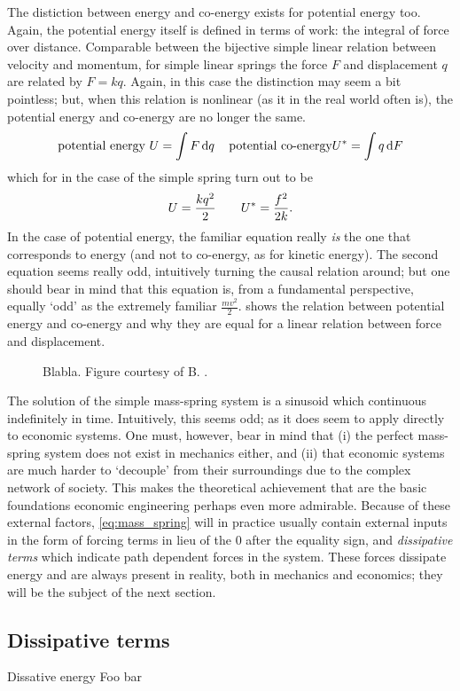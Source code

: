 The distiction between energy and co-energy exists for potential energy too. Again, the potential energy itself is defined in terms of work: the integral of force over distance. Comparable between the bijective simple linear relation between velocity and momentum, for simple linear springs the force $F$ and displacement $q$ are related by $F = kq$. Again, in this case the distinction may seem a bit pointless; but, when this relation is nonlinear (as it in the real world often is), the potential energy and co-energy are no longer the same. 
$$ \text{potential energy } U = \int F \dd{q} \quad \text{potential co-energy} U^* = \int q \dd{F} $$
which for in the case of the simple spring turn out to be
$$ U = \frac{kq^2}{2} \qquad U^* = \frac{f^2}{2k}. $$
In the case of potential energy, the familiar equation really \emph{is} the one that corresponds to energy (and not to co-energy, as for kinetic energy). The second equation seems really odd, intuitively turning the causal relation around; but one should bear in mind that this equation is, from a fundamental perspective, equally `odd' as the extremely familiar $\frac{mv^2}{2}$.  shows the relation between potential energy and co-energy and why they are equal for a linear relation between force and displacement.
\begin{figure}[ht]
    \centering
    
    \caption{Blabla. Figure courtesy of B. \citet{Krabbenborg2021}.}
    \label{fig:potential_energy}
\end{figure}
The solution of the simple mass-spring system is a sinusoid which continuous indefinitely in time. Intuitively, this seems odd; as it does seem to apply directly to economic systems. One must, however, bear in mind that (i) the perfect mass-spring system does not exist in mechanics either, and (ii) that economic systems are much harder to `decouple' from their surroundings due to the complex network of society. This makes the theoretical achievement that are the basic foundations economic engineering perhaps even more admirable. Because of these external factors, \cref{eq:mass_spring} will in practice usually contain external inputs in the form of forcing terms in lieu of the 0 after the equality sign, and \emph{dissipative terms} which indicate path dependent forces in the system. These forces dissipate energy and are always present in reality, both in mechanics and economics; they will be the subject of the next section. 

\subsection{Dissipative terms}
\begin{econ}{Dissative energy}
    Foo bar
\end{econ}

